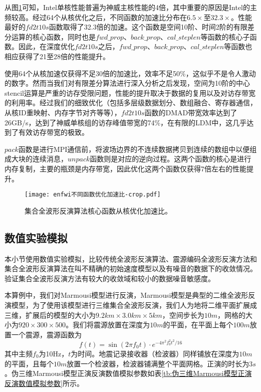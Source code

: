从图\ref{fig:集合全波形反演算法核心函数从核优化加速比}可知，Intel单核性能普遍为神威主核性能的4倍，其中重要的原因是Intel的主频较高。经过64个从核优化之后，不同函数的加速比分布在$6.5\times$至$32.3\times$。性能最好的$fd2t10s$函数取得了32.3倍的加速。这个函数是空间10阶、时间2阶的有限差分运算的核心函数，同时也是$fwd\_prop$、$back\_prop$、$cal\_steplen$等函数的核心子函数。因此，在深度优化$fd2t10s$之后，$fwd\_prop$、$back\_prop$、$cal\_steplen$等函数也相应获得了21至28倍的性能提升。

使用64个从核加速仅获得不足30倍的加速比，效率不足50\%，这似乎不是令人激动的数字。然而当我们对有限差分算法进行深入分析之后发现，空间为10阶的中心stencil运算是严重的访存受限问题，性能的提升取决于数据的复用以及对访存带宽的利用率。经过我们的细致优化（包括多层级数据划分、数组融合、寄存器通信，从核ID重映射、内存字节对齐等等），$fd2t10s$函数的DMAD带宽效率达到了26GB/s，达到了神威单核组的访存峰值带宽的74\%，在有限的LDM中，这几乎达到了有效访存带宽的极致。

$pack$函数是进行MPI通信前，将波场边界的不连续数据拷贝到连续的数组中以便组成大块的连续消息，$unpack$函数则是对应的逆向过程。这两个函数的核心是进行内存复制，主要的瓶颈是内存带宽，因此优化这两个函数仅获得7倍左右的性能提升。

\begin{figure}[ht]
\centering
\texttt{[image: enfwi不同函数优化加速比-crop.pdf]}
\caption{集合全波形反演算法核心函数从核优化加速比。}
\label{fig:集合全波形反演算法核心函数从核优化加速比}
\end{figure}



\subsection{数值实验模拟}
本小节使用数值实验模拟，比较传统全波形反演算法、震源编码全波形反演方法和集合全波形反演算法在叫不精确的初始速度模型以及有噪音的数据下的收敛情况。验证集合全波形反演方法有较大的收敛域和较小的数据噪音敏感度。

本算例中，我们对Marmousi模型进行反演，Marmousi模型是典型的二维全波形反演模型，为了使用该模型进行三维集合全波形反演，我们人为地将二维平面扩展成三维，扩展后的模型的大小为$9.2km\times 3.0km \times 5km$，空间步长为$10m$，网格的大小为$920\times 300 \times 500$。我们将震源放置在深度为$10m$的平面，在平面上每个$100m$放置一个震源，震源函数为
\begin{equation}
  f(t)=\sin(2\pi f_0t)\cdot e^{-4\pi^2f_0^2t^2/16}
\end{equation}
其中主频$f_0$为10Hz，$t$为时间。地震记录接收器（检波器）同样铺放在深度为$10m$的平面，且每个$10m$放置一个检波器，检波器铺满整个平面网格。正演的时长为$3s$。伪三维Marmousi模型正演反演数值模拟参数如表\ref{tb:伪三维Marmousi模型正演反演数值模拟参数}所示。

